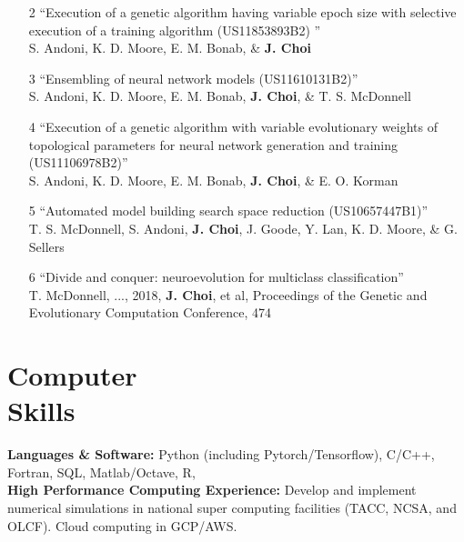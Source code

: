 \documentclass[margin,centered]{res}
\begin{document}
\begin{resume}
\begin{enumerate}
\item[2] ``Execution of a genetic algorithm having variable epoch size with selective execution of a training algorithm (US11853893B2) '' \\ S. Andoni, K. D. Moore, E. M. Bonab, \& \textbf{J. Choi}

\item[3] ``Ensembling of neural network models (US11610131B2)'' \\ S. Andoni, K. D. Moore, E. M. Bonab, \textbf{J. Choi}, \& T. S. McDonnell 

\item[4] ``Execution of a genetic algorithm with variable evolutionary weights of topological parameters for neural network generation and training (US11106978B2)'' \\ S. Andoni, K. D. Moore, E. M. Bonab, \textbf{J. Choi}, \& E. O. Korman

\item[5] ``Automated model building search space reduction (US10657447B1)'' \\ T. S. McDonnell, S. Andoni, \textbf{J. Choi}, J. Goode, Y. Lan, K. D. Moore, \& G. Sellers

\item[6] ``Divide and conquer: neuroevolution for multiclass classification'' \\ T. McDonnell, ..., 2018, \textbf{J. Choi}, et al, Proceedings of the Genetic and Evolutionary Computation Conference, 474

\end{enumerate} 

\section{Computer \\ Skills} 
{\bf Languages \& Software:} Python (including Pytorch/Tensorflow), C/C++, Fortran, SQL, Matlab/Octave, R,\\
{\bf High Performance Computing Experience:} Develop and implement numerical simulations in national super computing facilities (TACC, NCSA, and OLCF). Cloud computing in GCP/AWS.


\end{resume}
\end{document}
